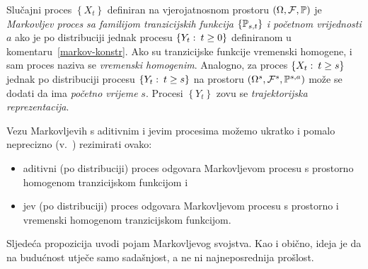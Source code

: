\documentclass[main.tex]{subfiles}
\begin{document}
\begin{definicija}
	Slučajni proces \( \left\{ X_t \right\} \) definiran na vjerojatnosnom prostoru \( \left( \Omega, \mathcal F, \P \right) \) je \emph{Markovljev proces sa familijom tranzicijskih funkcija} \( \left\{ \Ptrans_{s, t} \right\} \) \emph{i početnom vrijednosti} \( a \) ako je po distribuciji jednak procesu \( \left\{ Y_t \st t \ge 0 \right\} \) definiranom u komentaru~\ref{markov-konstr}. Ako su tranzicijske funkcije vremenski homogene, i sam proces naziva se \emph{vremenski homogenim}. Analogno, za proces
	\( \left\{ X_t \st t \ge s \right\} \) jednak po distribuciji procesu \( \left\{ Y_t \st t \ge s\right\} \)
	na prostoru \( \left( \Omega^s, \mathcal F^s, \P^{s,a} \right) \) može se dodati da ima \emph{početno vrijeme} \( s \). Procesi \( \left\{ Y_t \right\} \) zovu se \emph{trajektorijska reprezentacija}.
\end{definicija}

Vezu Markovljevih s aditivnim i \levy jevim procesima možemo ukratko i pomalo neprecizno
(v.~\cite[]{sato}) rezimirati ovako:
\begin{itemize}
	\item aditivni (po distribuciji) proces odgovara Markovljevom procesu s prostorno homogenom tranzicijskom funkcijom i
	\item \levy jev (po distribuciji) proces odgovara Markovljevom procesu s prostorno i vremenski homogenom tranzicijskom funkcijom.
\end{itemize}

Sljedeća propozicija uvodi pojam Markovljevog svojstva. Kao i obično, ideja je da
na budućnost utječe samo sadašnjost, a ne ni najneposrednija prošlost.
\end{document}
